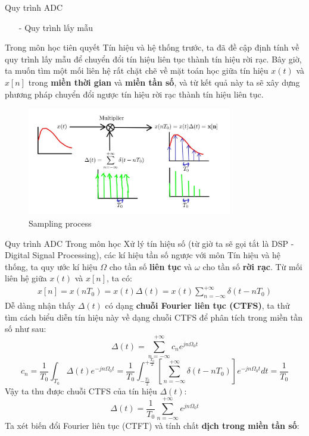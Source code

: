 \documentclass[8pt]{beamer}
\begin{document}
\begin{frame}{Quy trình ADC}
\begin{itemize}
	\item[-] Quy trình lấy mẫu
\end{itemize}
Trong môn học tiên quyết \alert{Tín hiệu và hệ thống} trước, ta đã đề cập định tính về quy trình lấy mẫu để chuyển đổi tín hiệu liên tục thành tín hiệu rời rạc. Bây giờ, ta muốn tìm một mối liên hệ rất chặt chẽ về mặt toán học giữa tín hiệu $x(t)$ và $x[n]$ trong \textbf{miền thời gian} và \textbf{miền tần số}, và từ kết quả này ta sẽ xây dựng phương pháp chuyển đổi ngược tín hiệu rời rạc thành tín hiệu liên tục.
\begin{figure}[h]
			\includegraphics[width=0.8\textwidth]{3.jpg}
			\caption{Sampling process}			\label{fig:re4}
		\end{figure}

\end{frame}
\begin{frame}{Quy trình ADC}
	Trong môn học Xử lý tín hiệu số (từ giờ ta sẽ gọi tắt là DSP - Digital Signal Processing), các kí hiệu tần số \alert{ngược với môn Tín hiệu và hệ thống}, ta quy ước kí hiệu $\Omega$ cho tần số \textbf{liên tục} và $\omega$ cho tần số \textbf{rời rạc}. Từ mối liên hệ giữa $x(t)$ và $x[n]$, ta có:
\begin{equation*}
\begin{split}
	x[n]=x(nT_{0})=x(t)\Delta(t)=x(t)\sum_{n=-\infty}^{+\infty}\delta(t-nT_{0})
\end{split}
\end{equation*}
Dễ dàng nhận thấy $\Delta(t)$ có dạng \textbf{chuỗi Fourier liên tục (CTFS)}, ta thử tìm cách biểu diễn tín hiệu này về dạng chuỗi CTFS để phân tích trong miền tần số như sau:
$$\Delta(t)=\sum_{n=-\infty}^{+\infty}c_{n}e^{jn\Omega_{0}t}$$
$$c_{n}=\frac{1}{T_{0}}\int_{T_{0}}\Delta(t)e^{-jn\Omega_{0}t}=\frac{1}{T_{0}}\int_{-\frac{T_{0}}{2}}^{+\frac{T_{0}}{2}}\left[\sum_{n=-\infty}^{+\infty}\delta(t-nT_{0})\right]e^{-jn\Omega_{0}t}dt=\frac{1}{T_{0}}$$
Vậy ta thu được chuỗi CTFS của tín hiệu $\Delta(t)$: 
$$\Delta(t)=\frac{1}{T_{0}}\sum_{n=-\infty}^{+\infty}e^{jn\Omega_{0}t}$$
Ta xét biến đổi Fourier liên tục (CTFT) và tính chất \textbf{dịch trong miền tần số}:
\end{frame}
\end{document}
